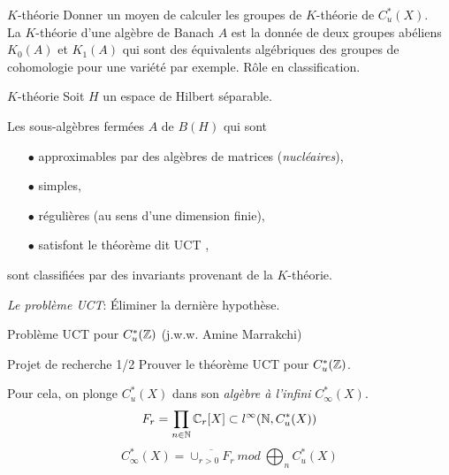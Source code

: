 \begin{frame}{$K$-th\'eorie}
Donner un moyen de calculer les groupes de $K$-th\'eorie de $C^*_u(X)$.\\
\vfill
La $K$-th\'eorie d'une alg\`ebre de Banach $A$ est la donn\'ee de deux groupes ab\'eliens $K_0(A)$ et $K_1(A)$ qui sont des \'equivalents alg\'ebriques des groupes de cohomologie pour une vari\'et\'e par exemple.  
\vfill
R\^{o}le en classification.\\
\vfill

\end{frame}

\begin{frame}{$K$-th\'eorie}
Soit $H$ un espace de Hilbert s\'eparable.
\vfill
\begin{theorem}
Les sous-alg\`ebres ferm\'ees $A$ de $B(H)$ qui sont
\begin{itemize}
\item[$\bullet$] approximables par des alg\`ebres de matrices (\textit{nucl\'eaires}),
\item[$\bullet$] simples,
\item[$\bullet$] r\'eguli\`eres (au sens d'une dimension finie),
\item[$\bullet$] satisfont le th\'eor\`eme dit UCT ,
\end{itemize}
sont classifi\'ees par des invariants provenant de la $K$-th\'eorie.
\end{theorem} 
\vfill
\textit{Le probl\`eme UCT}: \'Eliminer la derni\`ere hypoth\`ese.
\end{frame}

\begin{frame}{Probl\`eme UCT pour $C^*_u(\mathbb Z)$ (j.w.w. Amine Marrakchi)}
\begin{block}{Projet de recherche 1/2}
Prouver le th\'eor\`eme UCT pour $C^*_u(\mathbb Z)$.
\end{block}
\vfill
Pour cela, on plonge $C^*_u(X)$ dans son \textit{alg\`ebre \`a l'infini} $C^*_\infty(X)$.
\[ F_r = \prod_{n\in \mathbb N} \mathbb C_r[X] \subset l^\infty(\mathbb N , C^*_u(X))\]
\[C^*_\infty(X) = \overline{\cup_{r>0 } F_r} \ mod \ \bigoplus_n C^*_u(X)\]
\end{frame}

